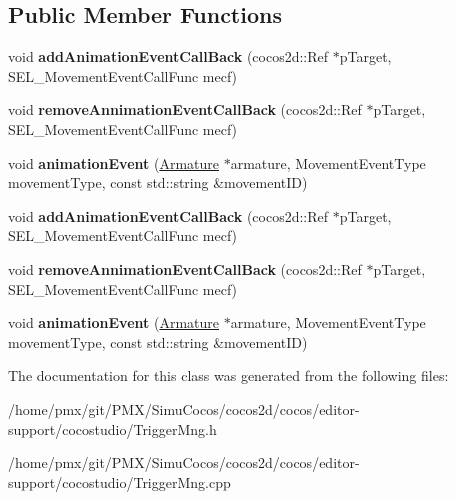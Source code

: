\subsection*{Public Member Functions}
\begin{DoxyCompactItemize}
\item 
\mbox{\label{classcocostudio_1_1ArmatureMovementDispatcher_afe56507a0978f68f0b3cf8844e2509e0}} 
void {\bfseries add\+Animation\+Event\+Call\+Back} (cocos2d\+::\+Ref $\ast$p\+Target, S\+E\+L\+\_\+\+Movement\+Event\+Call\+Func mecf)
\item 
\mbox{\label{classcocostudio_1_1ArmatureMovementDispatcher_a8cd0836d578ced45f07c99c1e79d2654}} 
void {\bfseries remove\+Annimation\+Event\+Call\+Back} (cocos2d\+::\+Ref $\ast$p\+Target, S\+E\+L\+\_\+\+Movement\+Event\+Call\+Func mecf)
\item 
\mbox{\label{classcocostudio_1_1ArmatureMovementDispatcher_a4291f0a6d9568c8003014a51e1a668a2}} 
void {\bfseries animation\+Event} (\hyperlink{classcocostudio_1_1Armature}{Armature} $\ast$armature, Movement\+Event\+Type movement\+Type, const std\+::string \&movement\+ID)
\item 
\mbox{\label{classcocostudio_1_1ArmatureMovementDispatcher_afe56507a0978f68f0b3cf8844e2509e0}} 
void {\bfseries add\+Animation\+Event\+Call\+Back} (cocos2d\+::\+Ref $\ast$p\+Target, S\+E\+L\+\_\+\+Movement\+Event\+Call\+Func mecf)
\item 
\mbox{\label{classcocostudio_1_1ArmatureMovementDispatcher_a8cd0836d578ced45f07c99c1e79d2654}} 
void {\bfseries remove\+Annimation\+Event\+Call\+Back} (cocos2d\+::\+Ref $\ast$p\+Target, S\+E\+L\+\_\+\+Movement\+Event\+Call\+Func mecf)
\item 
\mbox{\label{classcocostudio_1_1ArmatureMovementDispatcher_a4291f0a6d9568c8003014a51e1a668a2}} 
void {\bfseries animation\+Event} (\hyperlink{classcocostudio_1_1Armature}{Armature} $\ast$armature, Movement\+Event\+Type movement\+Type, const std\+::string \&movement\+ID)
\end{DoxyCompactItemize}


The documentation for this class was generated from the following files\+:\begin{DoxyCompactItemize}
\item 
/home/pmx/git/\+P\+M\+X/\+Simu\+Cocos/cocos2d/cocos/editor-\/support/cocostudio/Trigger\+Mng.\+h\item 
/home/pmx/git/\+P\+M\+X/\+Simu\+Cocos/cocos2d/cocos/editor-\/support/cocostudio/Trigger\+Mng.\+cpp\end{DoxyCompactItemize}
